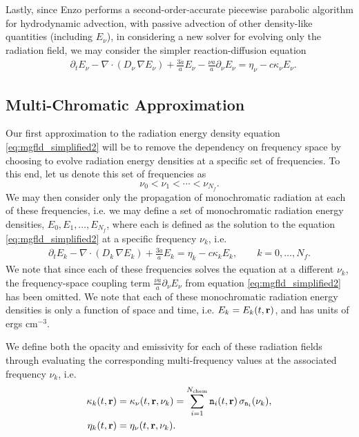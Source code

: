 \documentclass[10pt]{article}
\renewcommand{\(}{\left(}
\renewcommand{\)}{\right)}
\newcommand{\rvec}{{\bf r}}
\newcommand{\adot}{\dot{a}}
\newcommand{\Enu}{E_{\nu}}
\newcommand{\mn}{{\tt n}}
\begin{document}
Lastly, since Enzo performs a second-order-accurate piecewise
parabolic algorithm for hydrodynamic advection, with passive advection
of other density-like quantities (including $\Enu$), in considering a
new solver for evolving only the radiation field, we may consider the
simpler reaction-diffusion equation
\begin{align}
  \label{eq:mgfld_simplified2}
  &\partial_{t} \Enu - \nabla\cdot(D_{\nu}\,\nabla\Enu) 
      + \frac{3 \adot}{a} \Enu - \frac{\nu \adot}{a}\partial_{\nu}\Enu
    = \eta_{\nu} - c \kappa_{\nu} \Enu.
\end{align}




\subsection{Multi-Chromatic Approximation}
\label{subsec:multi_chromatic}

Our first approximation to the radiation energy density equation
\eqref{eq:mgfld_simplified2} will be to remove the dependency on
frequency space by choosing to evolve radiation energy densities at a
specific set of frequencies.  To this end, let us denote this set of
frequencies as
\begin{equation}
\label{eq:monochromatic_frequencies}
  \nu_0 < \nu_1 < \cdots < \nu_{N_f}.
\end{equation}
We may then consider only the propagation of monochromatic radiation
at each of these frequencies, i.e. we may define a set of
monochromatic radiation energy densities, $E_0, E_1, \ldots, E_{N_f}$,
where each is defined as the solution to the equation
\eqref{eq:mgfld_simplified2} at a specific frequency $\nu_k$, i.e.
\begin{align}
  \label{eq:mgfld_multichromatic}
  \partial_{t} E_k - \nabla\cdot(D_k\,\nabla E_k) + \frac{3 \adot}{a}
  E_k = \eta_k - c \kappa_k E_k, \qquad k=0,\ldots,N_f.
\end{align}
We note that since each of these frequencies solves the equation at a
different $\nu_k$, the frequency-space coupling term 
$\frac{\nu \adot}{a}\partial_{\nu}\Enu$ from equation
\eqref{eq:mgfld_simplified2} has been omitted.
We note that each of these monochromatic radiation energy densities is
only a function of space and time, i.e. $E_k = E_k(t,\rvec)$, and
has units of ergs cm$^{-3}$.

We define both the opacity and emissivity for each of these radiation
fields through evaluating the corresponding multi-frequency values at
the associated frequency $\nu_k$, i.e.
\begin{align}
\label{eq:opacity_multichromatic}
  \kappa_k(t,\rvec) &= \kappa_{\nu}(t,\rvec,\nu_k) = \sum_{i=1}^{N_\text{chem}} \mn_i(t,\rvec)\, \sigma_{\mn_i} (\nu_k), \\
\label{eq:emissivity_multichromatic}
  \eta_k(t,\rvec) &= \eta_{\nu}(t,\rvec,\nu_k).
\end{align}
\end{document}
